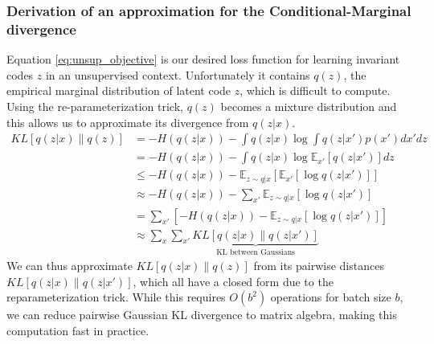 \subsubsection{Derivation of an approximation for the Conditional-Marginal divergence}
Equation \ref{eq:unsup_objective} is our desired loss function for learning invariant codes $z$ in an unsupervised context. Unfortunately it contains $q(z)$, the empirical marginal distribution of latent code $z$, which is difficult to compute. Using the re-parameterization trick, $q(z)$ becomes a mixture distribution and this allows us to approximate its divergence from $q(z|x)$. 
\begin{align}
KL[ q(z|x) \| q(z) ] & = -H(q(z|x)) - \int q(z|x) \log \int q(z|x')p(x') dx' dz\\
& = -H(q(z|x)) - \int q(z|x) \log \mathbb{E}_{x'}[q(z|x')] dz\\
& \leq -H(q(z|x)) - \mathbb{E}_{z\sim q | x}[\mathbb{E}_{x'}[\log q(z|x') ]]\\
& \approx -H(q(z|x)) - \sum_{x'}\mathbb{E}_{z\sim q | x} [\log q(z|x')]\\
& = \sum_{x'}[ -H(q(z|x)) - \mathbb{E}_{z\sim q | x} [\log q(z|x')]]\\
& \approx \sum_{x}\sum_{x'} \underbrace{KL[q(z|x) \| q(z|x')]}_{\text{KL between Gaussians}} \label{eq:KLqzxqz}
\end{align}
We can thus approximate $KL[ q(z|x) \| q(z) ]$ from its pairwise distances $KL[q(z|x) \| q(z|x')]$, which all have a closed form due to the reparameterization trick. While this requires $O(b^2)$ operations for batch size $b$, we can reduce pairwise Gaussian KL divergence to matrix algebra, making this computation fast in practice.

